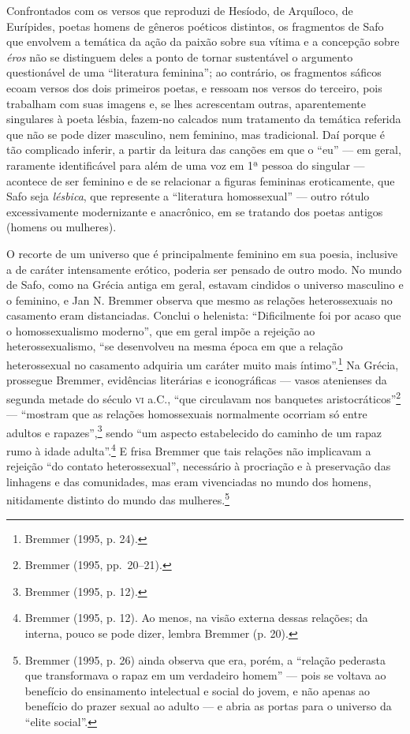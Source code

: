 Confrontados com os versos que reproduzi de Hesíodo, de Arquíloco, de Eurípides,
poetas homens de gêneros poéticos distintos, os fragmentos de Safo que envolvem
a temática da ação da paixão sobre sua vítima e a concepção sobre \textit{éros}
não se distinguem deles a ponto de tornar sustentável o argumento questionável
de uma “literatura feminina”; ao contrário, os fragmentos sáficos ecoam versos
dos dois primeiros poetas, e ressoam nos versos do terceiro, pois trabalham com
suas imagens e, se lhes acrescentam outras, aparentemente singulares à poeta
lésbia, fazem-no calcados num tratamento da temática referida que não se pode
dizer masculino, nem feminino, mas tradicional. Daí porque é tão complicado
inferir, a partir da leitura das canções em que o “eu” --- em geral, raramente
identificável para além de uma voz em 1ª pessoa do singular --- acontece de ser
feminino e de se relacionar a figuras femininas eroticamente, que Safo seja
\textit{lésbica}, que represente a “literatura homossexual” --- outro rótulo
excessivamente modernizante e anacrônico, em se tratando dos poetas antigos
(homens ou mulheres).

O recorte de um universo que é principalmente feminino em sua poesia, inclusive
a de caráter intensamente erótico, poderia ser pensado de outro modo. No mundo
de Safo, como na Grécia antiga em geral, estavam cindidos o universo masculino
e o feminino, e Jan N. Bremmer observa que mesmo as relações
heterossexuais no casamento eram distanciadas. Conclui o helenista:
“Dificilmente foi por acaso que o homossexualismo moderno”, que em geral impõe
a rejeição ao heterossexualismo, “se desenvolveu na mesma época em que a
relação heterossexual no casamento adquiria um caráter muito mais íntimo”.\footnote{ Bremmer (1995, p. 24).} Na
Grécia, prossegue Bremmer, evidências literárias e iconográficas --- vasos
atenienses da segunda metade do século \textsc{vi} a.C., “que circulavam nos banquetes
aristocráticos”\footnote{ Bremmer (1995, pp.~20--21).} --- “mostram que as relações homossexuais normalmente
ocorriam só entre adultos e rapazes”,\footnote{ Bremmer (1995, p. 12).} sendo “um aspecto estabelecido do
caminho de um rapaz rumo à idade adulta”.\footnote{ Bremmer (1995, p. 12). Ao menos, na visão
externa dessas relações; da interna, pouco se pode dizer, lembra Bremmer (p.
20).} E frisa Bremmer que tais relações não implicavam a rejeição “do contato
heterossexual”, necessário à procriação e à preservação das linhagens e das
comunidades, mas eram vivenciadas no mundo dos homens, nitidamente distinto do
mundo das mulheres.\footnote{ Bremmer (1995, p. 26) ainda observa que era,
porém, a “relação pederasta que transformava o rapaz em um verdadeiro homem” ---
pois se voltava ao benefício do ensinamento intelectual e social do jovem, e
não apenas ao benefício do prazer sexual ao adulto --- e abria as portas para o
universo da “elite social”.}

